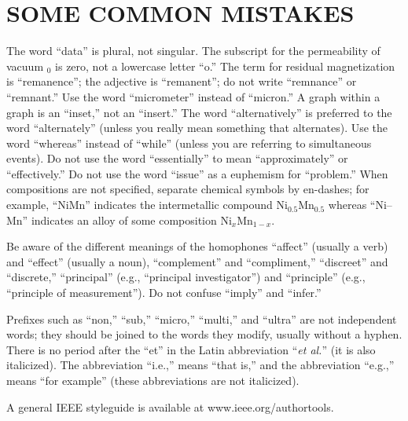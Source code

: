 \section{SOME COMMON MISTAKES}
The word ``data'' is plural, not singular. The subscript for the 
permeability of vacuum \textmu $_{0}$ is zero, not a lowercase letter ``o.'' 
The term for residual magnetization is ``remanence''; the adjective is 
``remanent''; do not write ``remnance'' or ``remnant.'' Use the word 
``micrometer'' instead of ``micron.'' A graph within a graph is an 
``inset,'' not an ``insert.'' The word ``alternatively'' is preferred to the 
word ``alternately'' (unless you really mean something that alternates). Use 
the word ``whereas'' instead of ``while'' (unless you are referring to 
simultaneous events). Do not use the word ``essentially'' to mean 
``approximately'' or ``effectively.'' Do not use the word ``issue'' as a 
euphemism for ``problem.'' When compositions are not specified, separate 
chemical symbols by en-dashes; for example, ``NiMn'' indicates the 
intermetallic compound Ni$_{0.5}$Mn$_{0.5}$ whereas ``Ni--Mn'' indicates an 
alloy of some composition Ni$_{x}$Mn$_{1-x}$.

Be aware of the different meanings of the homophones ``affect'' (usually a 
verb) and ``effect'' (usually a noun), ``complement'' and ``compliment,'' 
``discreet'' and ``discrete,'' 
``principal'' (e.g., ``principal investigator'') and ``principle'' 
(e.g., ``principle of measurement''). Do not confuse ``imply'' and 
``infer.'' 

Prefixes such as ``non,'' ``sub,'' ``micro,'' ``multi,'' and ``ultra'' are 
not independent words; they should be joined to the words they modify, 
usually without a hyphen. There is no period after the ``et'' in the Latin 
abbreviation ``\textit{et al.}'' (it is also italicized). The abbreviation ``i.e.,'' means 
``that is,'' and the abbreviation ``e.g.,'' means ``for example'' (these 
abbreviations are not italicized).

A general IEEE styleguide is available at www.ieee.org/\break authortools.